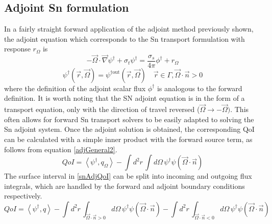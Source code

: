 \documentclass{article}
\newcommand{\vr}{\vec{r}}
\newcommand{\vO}{\vec{\Omega}}
\newcommand{\bra}{\left\langle}
\newcommand{\ket}{\right\rangle}
\newcommand{\vgrad}{\vec{\nabla}}
\newcommand{\sigt}{\sigma_t}
\newcommand{\sigs}{\sigma_s}
\newcommand{\angSource}{q_\Omega}
\newcommand{\angResp}{r_\Omega}
\begin{document}
\subsection{Adjoint Sn formulation}
In a fairly straight forward application of the adjoint method previously shown, the adjoint equation which corresponds to the Sn transport formulation with response $\angResp$ is
\begin{equation}
\label{snAdj}
- \vO \cdot \vgrad \psi^\dag + \sigt \psi^\dag = \frac{\sigs}{4 \pi} \phi^\dag + \angResp
\end{equation}
\begin{equation}
\psi^\dag(\vr,\vO) = \psi^{\dag \text{out}}(\vr,\vO) \quad \vr \in \Gamma, \vO \cdot \vec{n} > 0
\end{equation}
where the definition of the adjoint scalar flux $\phi^\dag$ is analogous to the forward definition. It is worth noting that the SN adjoint equation is in the form of a transport equation, only with the direction of travel reversed ($\vO \to -\vO)$. This often allows for forward Sn transport solvers to be easily adapted to solving the Sn adjoint system. Once the adjoint solution is obtained, the corresponding QoI can be calculated with a simple inner product with the forward source term, as follows from equation \ref{adjGeneral2}. 
\begin{equation}
\label{snAdjQoI}
QoI = \bra \psi^\dag , \angSource \ket - \int d^2 r \, \int d  \Omega \, \psi^\dag \psi ( \vO \cdot \vec{n} )
\end{equation}
The surface interval in \ref{snAdjQoI} can be split into incoming and outgoing flux integrals, which are handled by the forward and adjoint boundary conditions respectively. 
\begin{equation}
QoI = \bra \psi^\dag , q \ket - \int d^2 r \, \int_{\vO \cdot \vec{n} >0} d  \Omega \, \psi^\dag \psi ( \vO \cdot \vec{n} ) - \int d^2 r \, \int_{\vO \cdot \vec{n} <0} d  \Omega \, \psi^\dag \psi ( \vO \cdot \vec{n} )
\end{equation}
\end{document}
